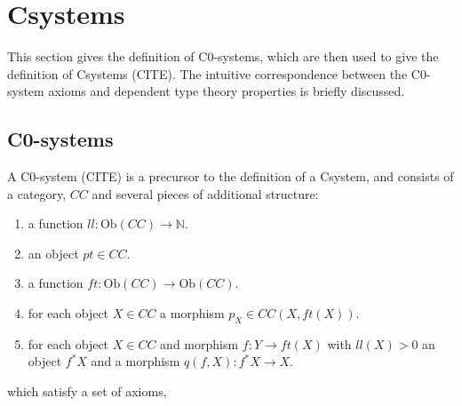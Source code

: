 \section{Csystems}
This section gives the definition of C0-systems, which are then used to give the
definition of Csystems (CITE). The intuitive correspondence between the
C0-system axioms and dependent type theory properties is briefly discussed.

\subsection{C0-systems}
A C0-system (CITE) is a precursor to the definition of a Csystem, and consists
of a category, $CC$ and several pieces of additional structure:
\begin{enumerate}
    \item a function $ll: \text{Ob}(CC)\to \mathbb{N}$.
    \item an object $pt\in CC$.
    \item a function $ft: \text{Ob}(CC)\to \text{Ob}(CC)$.
    \item for each object $X\in CC$ a morphism $p_X\in CC(X, ft(X))$.
    \item for each object $X\in CC$ and morphism $f: Y\to ft(X)$ with $ll(X) >
    0$ an object $f^*X$ and a morphism $q(f, X) : f^*X\to X$.
\end{enumerate}
which satisfy a set of axioms,
